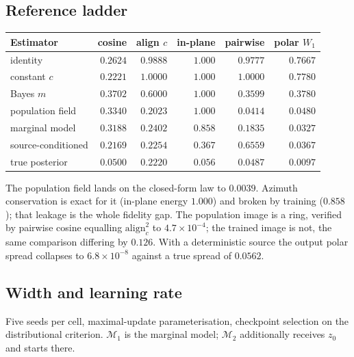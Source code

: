 \documentclass[11pt]{article}
\begin{document}
\subsection{Reference ladder}

\begin{center}
\begin{tabular}{@{}lrrrrr@{}}
\toprule
Estimator & cosine & align $c$ & in-plane & pairwise & polar $W_1$\\
\midrule
identity & $0.2624$ & $0.9888$ & $1.000$ & $0.9777$ & $0.7667$\\
constant $c$ & $0.2221$ & $1.0000$ & $1.000$ & $1.0000$ & $0.7780$\\
Bayes $m$ & $0.3702$ & $0.6000$ & $1.000$ & $0.3599$ & $0.3780$\\
population field & $0.3340$ & $0.2023$ & $1.000$ & $0.0414$ & $0.0480$\\
marginal model & $0.3188$ & $0.2402$ & $0.858$ & $0.1835$ & $0.0327$\\
source-conditioned & $0.2169$ & $0.2254$ & $0.367$ & $0.6559$ & $0.0367$\\
true posterior & $0.0500$ & $0.2220$ & $0.056$ & $0.0487$ & $0.0097$\\
\bottomrule
\end{tabular}
\end{center}

The population field lands on the closed-form law to $0.0039$. Azimuth conservation is exact for
it (in-plane energy $1.000$) and broken by training ($0.858$); that leakage is the whole fidelity
gap. The population image is a ring, verified by pairwise cosine equalling $\mathrm{align}_c^2$ to
$4.7\times10^{-4}$; the trained image is not, the same comparison differing by $0.126$. With a
deterministic source the output polar spread collapses to $6.8\times10^{-8}$ against a true
spread of $0.0562$.

\subsection{Width and learning rate}

Five seeds per cell, maximal-update parameterisation, checkpoint selection on the distributional
criterion. $\mathcal M_1$ is the marginal model; $\mathcal M_2$ additionally receives $z_0$ and
starts there.
\end{document}

